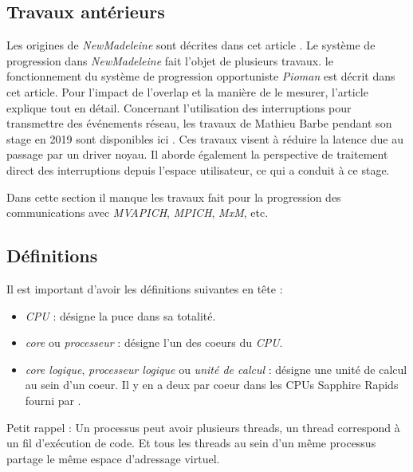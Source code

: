 \subsection{Travaux antérieurs}

Les origines de \emph{NewMadeleine} sont décrites dans cet article \cite{aumage:inria-00127356}.
Le système de progression dans \emph{NewMadeleine} fait l'objet de plusieurs travaux.
le fonctionnement du système de progression opportuniste \emph{Pioman} est décrit dans cet article\cite{denis:hal-01087775}.
Pour l'impact de l'overlap et la manière de le mesurer, l'article \cite{denis:hal-01324179} explique tout en détail.
Concernant l'utilisation des interruptions pour transmettre des événements réseau, les travaux de Mathieu Barbe pendant son stage en 2019 sont disponibles ici \cite{internshipMathieu}.
Ces travaux visent à réduire la latence due au passage par un driver noyau.
Il aborde également la perspective de traitement direct des interruptions depuis l'espace utilisateur, ce qui a conduit à ce stage.

Dans cette section il manque les travaux fait pour la progression des communications avec \emph{MVAPICH}, \emph{MPICH}, \emph{MxM}, etc.

\subsection{Définitions}

Il est important d'avoir les définitions suivantes en tête :
\begin{itemize}
  \item \emph{CPU} : désigne la puce dans sa totalité.
  \item \emph{core} ou \emph{processeur} : désigne l'un des coeurs du \emph{CPU}.
  \item \emph{core logique}, \emph{processeur logique} ou \emph{unité de calcul} : %
  désigne une unité de calcul au sein d'un coeur. Il y en a deux par coeur dans les CPUs \intel{} Sapphire Rapids fourni par \atos{}.
\end{itemize}

Petit rappel : Un processus peut avoir plusieurs threads, un thread correspond à un fil d'exécution de code.
Et tous les threads au sein d'un même processus partage le même espace d'adressage virtuel.
